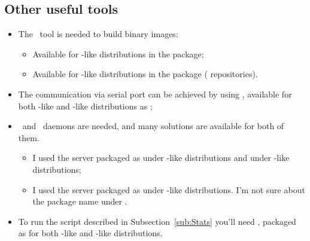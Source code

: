 
\subsection{ Other useful tools } \label{sub:OtherTools}

    \begin{itemize}

    \item  The \mkimage\ tool is needed to build binary images:

        \begin{itemize}
        \item   Available for \Debian-like distributions in the
                 package;
        \item   Available for \RedHat-like distributions in the
                 package (
                repositories).
        \end{itemize}

    \item   The communication via serial port can be achieved by using
            \Minicom, available for both \Debian-like and \RedHat-like
            distributions as ;

    \item   \BootP\ and \TFTP\ daemons are needed, and many solutions are
            available for both of them.
        \begin{itemize}
        \item   I used the server packaged as 
                under \Debian-like distributions and
                 under \RedHat-like
                distributions;
        \item   I used the server packaged as 
                under \Debian-like distributions. I'm not sure about
                the package name under \RedHat.
        \end{itemize}

    \item   To run the script described in Subsection~\ref{sub:Stats}
            you'll need , packaged as
             for both \Debian-like and
            \RedHat-like distributions.

    \end{itemize}

